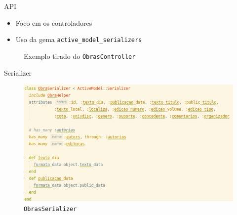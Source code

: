 \documentclass[aspectratio=43,display]{beamer}
\begin{document}
  \begin{frame}{API}
    \begin{itemize}
      \item Foco em  os controladores \pause
      \item Uso da gema \texttt{active\_model\_serializers} \pause
    \end{itemize}
    \begin{figure}
      \centering
      \caption{Exemplo tirado do \texttt{ObrasController}}
    \end{figure}
  \end{frame}

  \begin{frame}{Serializer}
    \begin{figure}
      \centering
      \includegraphics[width=.9\textwidth]{../figuras/obra_serializer.png}
      \caption{\texttt{ObrasSerializer}}
    \end{figure}
  \end{frame}
\end{document}
